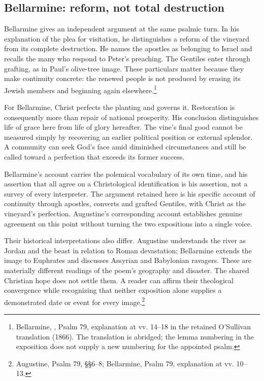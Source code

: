 \subsection{Bellarmine: reform, not total destruction}
Bellarmine gives an independent argument at the same psalmic turn. In his explanation of the plea for visitation, he distinguishes a reform of the vineyard from its complete destruction. He names the apostles as belonging to Israel and recalls the many who respond to Peter's preaching. The Gentiles enter through grafting, as in Paul's olive-tree image. These particulars matter because they make continuity concrete: the renewed people is not produced by erasing its Jewish members and beginning again elsewhere.\footnote{Bellarmine, , Psalm 79, explanation at vv. 14--18 in the retained O'Sullivan translation (1866). The translation is abridged; the lemma numbering in the exposition does not supply a new numbering for the appointed psalm.}

For Bellarmine, Christ perfects the planting and governs it. Restoration is consequently more than repair of national prosperity. His conclusion distinguishes life of grace here from life of glory hereafter. The vine's final good cannot be measured simply by recovering an earlier political position or external splendor. A community can seek God's face amid diminished circumstances and still be called toward a perfection that exceeds its former success.

Bellarmine's account carries the polemical vocabulary of its own time, and his assertion that all agree on a Christological identification is his assertion, not a survey of every interpreter. The argument retained here is his specific account of continuity through apostles, converts and grafted Gentiles, with Christ as the vineyard's perfection. Augustine's corresponding account establishes genuine agreement on this point without turning the two expositions into a single voice.

Their historical interpretations also differ. Augustine understands the river as Jordan and the beast in relation to Roman devastation; Bellarmine extends the image to Euphrates and discusses Assyrian and Babylonian ravagers. These are materially different readings of the poem's geography and disaster. The shared Christian hope does not settle them. A reader can affirm their theological convergence while recognizing that neither exposition alone supplies a demonstrated date or event for every image.\footnote{Augustine, Psalm 79, §§6--8; Bellarmine, Psalm 79, explanation at vv. 10--13.}

